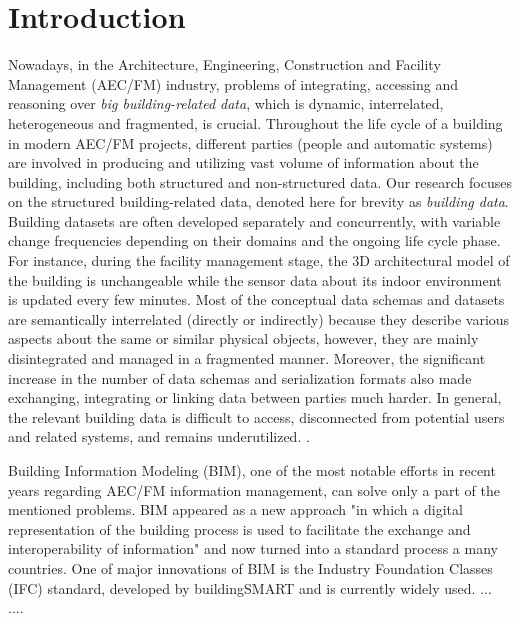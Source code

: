 \section{Introduction}\label{introduction}



Nowadays, in the Architecture, Engineering, Construction and Facility Management (AEC/FM) industry, problems of integrating, accessing and reasoning over \emph{big building-related data}, which is dynamic, interrelated, heterogeneous and fragmented, is crucial.
Throughout the life cycle of a building in modern AEC/FM projects, different parties (people and automatic systems) are involved in producing and utilizing vast volume of information about the building, including both structured and non-structured data.
Our research focuses on the structured building-related data, denoted here for brevity as \emph{building data}.
Building datasets are often developed separately and concurrently, with variable change frequencies depending on their domains and the ongoing life cycle phase.
For instance, during the facility management stage, the 3D architectural model of the building is unchangeable while the sensor data about its indoor environment is updated every few minutes.
Most of the conceptual data schemas and datasets are semantically interrelated (directly or indirectly) because they describe various aspects about the same or similar physical objects, however, they are mainly disintegrated and managed in a fragmented manner.
Moreover, the significant increase in the number of data schemas and serialization formats also made exchanging, integrating or linking data between parties much harder. 
In general, the relevant building data is difficult to access, disconnected from potential users and related systems, and remains underutilized. \cite{torma2012distributed}.





Building Information Modeling (BIM), one of the most notable efforts in recent years regarding AEC/FM information management, can solve only a part of the mentioned problems.
BIM appeared as a new approach "in which a digital representation of the building process is used to facilitate the exchange and interoperability of information" \cite{eastman2011bim} and now turned into a standard process a many countries.
One of major innovations of BIM is the Industry Foundation Classes (IFC) standard, developed by buildingSMART and is currently widely used.
...
....



